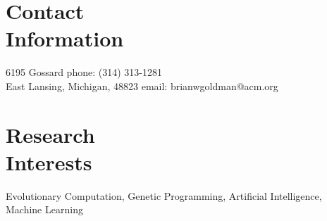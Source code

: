\documentclass[margin,line]{resume}
\begin{document}
\begin{resume}

    \section{\mysidestyle Contact\\Information}

    6195 Gossard                            \hfill phone: (314) 313-1281          \vspace{0mm}\\\vspace{0mm}%
    East Lansing, Michigan, 48823                          \hfill email: brianwgoldman@acm.org          %
    \section{\mysidestyle Research\\Interests}
    Evolutionary Computation, Genetic Programming, Artificial Intelligence, Machine Learning


\end{resume}
\end{document}
